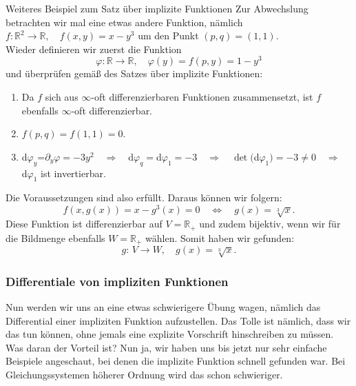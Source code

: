 \begin{Beispiel}
    {Weiteres Beispiel zum Satz über implizite Funktionen}
    Zur Abwechslung betrachten wir mal eine etwas andere Funktion, nämlich $f:\mathbb{R}^2\rightarrow\mathbb{R}, \quad f(x,y)=x-y^3$ um den Punkt $(p,q)=(1,1)$. \\
    
    Wieder definieren wir zuerst die Funktion
    \begin{equation*}
        \varphi:\mathbb{R}\rightarrow\mathbb{R}, \quad \varphi(y)=f(p,y)=1-y^3
    \end{equation*}
    und überprüfen gemäß des Satzes über implizite Funktionen:
    \begin{enumerate}
        \item Da $f$ sich aus $\infty$-oft differenzierbaren Funktionen zusammensetzt, ist $f$ ebenfalls $\infty$-oft differenzierbar.
        \item $f(p,q)=f(1,1)=0$.
        \item d$\varphi_y$=$\partial_y\varphi=-3y^2 \quad \Rightarrow \quad$d$\varphi_q=$d$\varphi_1=-3 \quad \Rightarrow \quad \det($d$\varphi_1)=-3\neq0 \quad \Rightarrow \quad$d$\varphi_1$ ist invertierbar.
    \end{enumerate}
    Die Voraussetzungen sind also erfüllt. Daraus können wir folgern:
    \begin{equation*}
        f(x,g(x))=x-g^3(x)=0\quad \Leftrightarrow \quad g(x)=\sqrt[3]{x}.
    \end{equation*}
    Diese Funktion ist differenzierbar auf $V=\mathbb{R}_+$ und zudem bijektiv, wenn wir für die Bildmenge ebenfalls $W=\mathbb{R}_+$ wählen. Somit haben wir gefunden:
    \begin{equation*}
        g:\,V\rightarrow W, \quad g(x)=\sqrt[3]{x}.
    \end{equation*}
\end{Beispiel}

\subsubsection{Differentiale von impliziten Funktionen}
Nun werden wir uns an eine etwas schwierigere Übung wagen, nämlich das Differential einer impliziten Funktion aufzustellen. Das Tolle ist nämlich, dass wir das tun können, ohne jemals eine explizite Vorschrift hinschreiben zu müssen. Was daran der Vorteil ist? Nun ja, wir haben uns bis jetzt nur sehr einfache Beispiele angeschaut, bei denen die implizite Funktion schnell gefunden war. Bei Gleichungssystemen höherer Ordnung wird das schon schwieriger. \\

